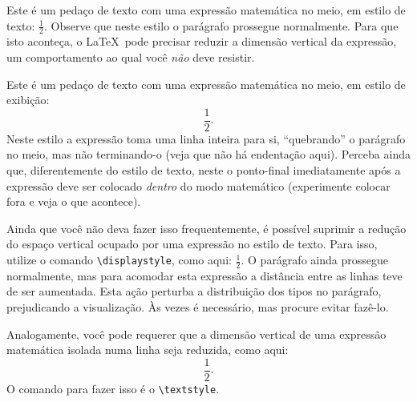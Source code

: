 \documentclass[a4paper,12pt]{article}
\begin{document}
	Este é um pedaço de texto com uma expressão matemática no meio, em estilo de
	texto: \(\frac{1}{2}\). Observe que neste estilo o parágrafo prossegue 
	normalmente. Para que isto aconteça, o \LaTeX\ pode precisar reduzir a
	dimensão vertical da expressão, um comportamento ao qual você \emph{não} deve
	resistir.
		
	Este é um pedaço de texto com uma expressão matemática no meio, em estilo de
	exibição: \[\frac{1}{2}.\] Neste estilo a expressão toma uma linha inteira
	para si, ``quebrando'' o parágrafo no meio, mas não terminando-o (veja que 
	não há endentação aqui). Perceba ainda que, diferentemente do estilo de 
	texto, neste o ponto-final imediatamente após a expressão deve ser colocado
	\emph{dentro} do modo matemático (experimente colocar fora e veja o que 
	acontece).
	
	Ainda que você não deva fazer isso frequentemente, é possível suprimir a
	redução do espaço vertical ocupado por uma expressão no estilo de texto.
	Para isso, utilize o comando \verb|\displaystyle|, como aqui: \(\displaystyle
	\frac{1}{2}\). O parágrafo ainda prossegue normalmente, mas para acomodar
	esta expressão a distância entre as linhas teve de ser aumentada. Esta ação
	perturba a distribuição dos tipos no parágrafo, prejudicando a visualização.
	Às vezes é necessário, mas procure evitar fazê-lo.
	
	Analogamente, você pode requerer que a dimensão vertical de uma expressão
	matemática isolada numa linha seja reduzida, como aqui: \[\textstyle\frac{1}
	{2}.\] O comando para fazer isso é o \verb|\textstyle|.
	
	
\end{document}
